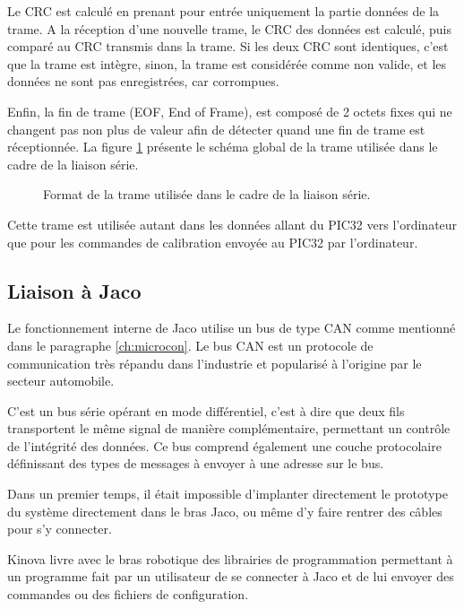 \documentclass[letterpaper, twoside, 12pt, memoire, creativecommons, hyperref]{thETS}
\begin{document}
Le CRC est calculé en prenant pour entrée uniquement la partie données de la trame. A la réception d'une nouvelle trame, le CRC des données est calculé, puis comparé au CRC transmis dans la trame. Si les deux CRC sont identiques, c'est que la trame est intègre, sinon, la trame est considérée comme non valide, et les données ne sont pas enregistrées, car corrompues.

Enfin, la fin de trame (EOF, End of Frame), est composé de 2 octets fixes qui ne changent pas non plus de valeur afin de détecter quand une fin de trame est réceptionnée. La figure \ref{fig:serialframe} présente le schéma global de la trame utilisée dans le cadre de la liaison série.

\begin{figure}
	\centering
	\caption{Format de la trame utilisée dans le cadre de la liaison série.}
	\label{fig:serialframe}
\end{figure}

Cette trame est utilisée autant dans les données allant du PIC32 vers l'ordinateur que pour les commandes de calibration envoyée au PIC32 par l'ordinateur.

\subsection{Liaison à Jaco}

Le fonctionnement interne de Jaco utilise un bus de type CAN comme mentionné dans le paragraphe \ref{ch:microcon}. Le bus CAN est un protocole de communication très répandu dans l'industrie et popularisé à l'origine par le secteur automobile. 

C'est un bus série opérant en mode différentiel, c'est à dire que deux fils transportent le même signal de manière complémentaire, permettant un contrôle de l'intégrité des données. Ce bus comprend également une couche protocolaire définissant des types de messages à envoyer à une adresse sur le bus. 

Dans un premier temps, il était impossible d'implanter directement le prototype du système directement dans le bras Jaco, ou même d'y faire rentrer des câbles pour s'y connecter. 

Kinova livre avec le bras robotique des librairies de programmation permettant à un programme fait par un utilisateur de se connecter à Jaco et de lui envoyer des commandes ou des fichiers de configuration. 
\end{document}
